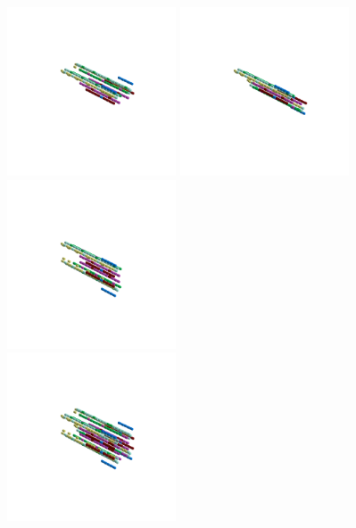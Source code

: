 \begin{minipage}[b]{0.48\linewidth}                                       
  \begin{figure}[H]
      \centering
        \vspace*{-1cm}
        \hspace*{-2cm}
        \includegraphics[width=5cm]{src/symmetries/pattern3_1-45.png}%
        \hspace*{-3cm}
        \includegraphics[width=5cm]{src/symmetries/pattern3_2-45.png}\\
        \vspace*{-3cm}
        \hspace*{-4cm}
        \includegraphics[width=5cm]{src/symmetries/pattern3_3-45.png} \\
        \vspace*{-5cm}
        \includegraphics[width=5cm]{src/symmetries/pattern3_4-45.png}
        \vspace*{-1cm}
  \caption*{}
  \end{figure}
\end{minipage}
